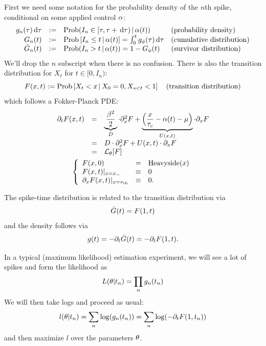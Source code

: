 \documentclass{article}
\begin{document}
First we need some notation for the probability density of the $n$th spike,
conditional on some applied control ${\alpha}$:
\begin{equation} 
\begin{array}{rcll} 
g_n({\tau}) \, \mathrm{d} {\tau} &:=& \operatorname{Prob}(I_{n} \in [{\tau}, {\tau} + \, \mathrm{d} {\tau})  \,|\,
 {\alpha}(t)) &
 \textrm{(probability density)} 
\\ 
G_{n}(t) &:=& \operatorname{Prob} \left[I_{n} \leq t  \,|\,
 {\alpha}(t) \right] = \int_0^t g_{\phi}({\tau}) \, \mathrm{d} {\tau} &
 \textrm{(cumulative distribution)}
\\
{ \bar{G} }_{n}(t) &:= & \operatorname{Prob}(I_{n}>t \,|\, {\alpha}(t) ) = 1 - G_{\phi}(t)
&
 \textrm{(survivor distribution)}
\end{array}
\label{eq:ISI_distribution_functions}
\end{equation}
We'll drop the $n$ subscript when there is no confusion. 
There is also the transition distribution for $X_t$ for $t \in [0,
I_{n})$:
\begin{equation}
F(x,t) := \operatorname{Prob} \left[X_{t} < x  \,|\,
 X_0 = 0, X_{s < t} < 1  \right]  \quad
 \textrm{(transition distribution)}
 \label{eq:transition_distribution}
\end{equation}
which follows a Fokker-Planck PDE:
\begin{equation}
\begin{gathered}
\begin{array}{lcl}
	{\partial}_t F (x,t) &=&
					\underbrace{\frac{{\beta}^2 }{2}}_{D}\cdot {\partial}^2_x F 
					+  
					\underbrace{\Big(\frac x{{ \tau_{c} }} - {\alpha}(t) - {\mu }  \Big)}_{U(x,t)}  \cdot {\partial}_x
					F 
					\\
					&=&
					D \cdot {\partial}^2_x F +
					U(x,t) \cdot {\partial}_x F
					\\
					&=&
					{ \mathcal{L} }_{\theta} [ F ]
					\end{array}
	\\
	\left\{ \begin{array}{lcl}
	 F (x,0) &=& \textrm{Heavyside}(x)
	\\
	F (x,t) |_{x={ x_{-} }} &\equiv& 0 
	\\
	{\partial}_x F (x,t) |_{x={ v_{\textrm{th} } }} &\equiv& 0.
	\end{array} \right.
\label{eq:FP_pde_OU_absorbBC_CDF}
\end{gathered}
\end{equation}

The spike-time distribution is related to the transition 
distribution via
$${ \bar{G} } (t) = F (1,t)$$ and the density follows via $$g(t)  = -{\partial}_t
{ \bar{G} }(t) = -{\partial}_t F(1,t).$$

In a typical (maximum likelihood) estimation experiment, we will see a lot of
spikes and form the likelihood as
$$
L({\theta}| t_n ) = \prod_n g_n(t_n)
$$
We will then take logs and proceed as usual:
$$
l({\theta}| t_n ) = \sum_n \log (g_n(t_n)) =  \sum_n \log ( -{\partial}_t F(1,t_n)) 
$$
and then maximize $l$ over the parameters ${\theta}$. 
\end{document}
